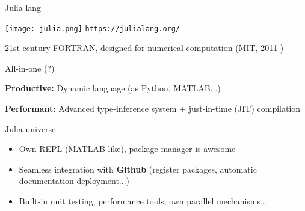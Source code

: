 \begin{frame}{Julia lang}


      \texttt{[image: julia.png]}
      \texttt{https://julialang.org/}

      21st century FORTRAN, designed for numerical computation (MIT, 2011-)

\begin{block}{All-in-one (?)}

\textbf{Productive:} Dynamic language (as Python, MATLAB...)

\textbf{Performant:} Advanced type-inference system + just-in-time (JIT) compilation

\end{block}




\end{frame}

\begin{frame}{Julia universe}

\begin{itemize}

  \item Own REPL (MATLAB-like), package manager is awesome


  \item Seamless integration with \textbf{Github} (register packages, automatic {\color{red} documentation} deployment...)

  \item Built-in unit testing,  performance tools, own parallel mechanisms...

\end{itemize}

\end{frame}

